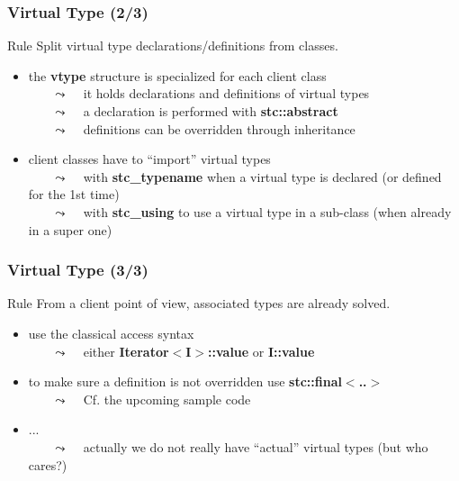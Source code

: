 \begin{frame}
  \frametitle{\scoop Virtual Type (2/3)}

  \begin{block}{Rule}
    Split virtual type declarations/definitions from classes.
  \end{block}

  \medskip

  \begin{itemize}
  \item the \textbf{vtype} structure is specialized for each client class\\
    ~~~ {\scriptsize $\leadsto$ ~ it holds declarations and definitions of virtual types }\\
    ~~~ {\scriptsize $\leadsto$ ~ a declaration is performed with \textbf{stc::abstract} }\\
    ~~~ {\scriptsize $\leadsto$ ~ definitions can be overridden through inheritance }
    \smallskip
  \item client classes have to ``import'' virtual types\\
    ~~~ {\scriptsize $\leadsto$ ~ with \textbf{stc\_typename} when a virtual type is declared {\tiny(or defined for the 1st time)} }\\
    ~~~ {\scriptsize $\leadsto$ ~ with \textbf{stc\_using} to use a virtual type in a sub-class {\tiny(when already in a super one)} }
  \end{itemize}

\end{frame}




\begin{frame}[fragile]
  \frametitle{\scoop Virtual Type (3/3)}

  \begin{block}{Rule}
    From a client point of view, associated types are already solved.
  \end{block}

  \medskip

  \begin{itemize}
    \item use the classical access syntax \\
      ~~~ {\scriptsize $\leadsto$ ~ either \textbf{Iterator$<$I$>$::value} or \textbf{I::value} }
      \smallskip
    \item to make sure a definition is not overridden use \textbf{stc::final$<$..$>$} \\
      ~~~ {\scriptsize $\leadsto$ ~ Cf. the upcoming sample code }
      \smallskip
    \item ...\\
      ~~~ {\scriptsize $\leadsto$ ~ actually we do not really have ``actual'' virtual types (but who cares?) }
    \end{itemize}

\end{frame}




